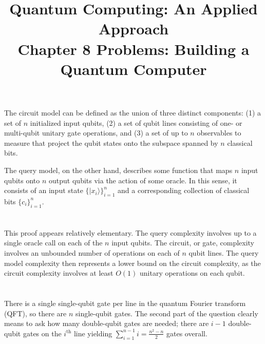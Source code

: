 \documentclass{article}
\date{}
\title{\textbf{Quantum Computing: An Applied Approach}\\\vspace*{1cm}
Chapter 8 Problems: Building a Quantum Computer
}
\begin{document}
\maketitle

\section{}

The circuit model can be defined as the union of three distinct components: (1) a set of $n$ initialized input qubits, (2) a set of qubit lines consisting of one- or multi-qubit unitary gate operations, and (3) a set of up to $n$ observables to measure that project the qubit states onto the subspace spanned by $n$ classical bits.

The query model, on the other hand, describes some function that maps $n$ input qubits onto $n$ output qubits via the action of some oracle. In this sense, it consists of an input state $\{|x_i\rangle\}_{i=1}^n$ and a corresponding collection of classical bits $\{c_i\}_{i=1}^n$.

\section{}

This proof appears relatively elementary. The query complexity involves up to a single oracle call on each of the $n$ input qubits. The circuit, or gate, complexity involves an unbounded number of operations on each of $n$ qubit lines. The query model complexity then represents a lower bound on the circuit complexity, as the circuit complexity involves at least $O(1)$ unitary operations on each qubit.

\section{}

There is a single single-qubit gate per line in the quantum Fourier transform (QFT), so there are $n$ single-qubit gates. The second part of the question clearly means to ask how many double-qubit gates are needed; there are $i-1$ double-qubit gates on the $i^\text{th}$ line yielding $\sum_{i=1}^{n-1}i=\boxed{\frac{n^2-n}{2}}$ gates overall.
\end{document}
